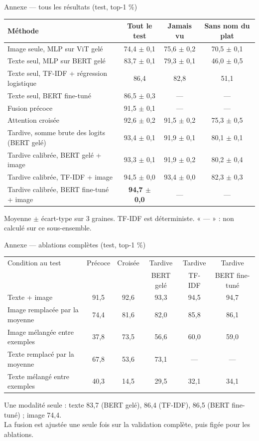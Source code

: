 \documentclass[aspectratio=169,11pt]{beamer}
\begin{document}
\begin{frame}{Annexe — tous les résultats (test, top-1 \%)}
\centering\small
\begin{tabular}{@{}lccc@{}}
\toprule
Méthode & Tout le test & Jamais vu & Sans nom du plat\\
\midrule
Image seule, MLP sur ViT gelé & 74,4 $\pm$ 0,1 & 75,6 $\pm$ 0,2 & 70,5 $\pm$ 0,1\\
Texte seul, MLP sur BERT gelé & 83,7 $\pm$ 0,1 & 79,3 $\pm$ 0,1 & 46,0 $\pm$ 0,5\\
Texte seul, TF-IDF + régression logistique & 86,4 & 82,8 & 51,1\\
Texte seul, BERT fine-tuné & 86,5 $\pm$ 0,3 & — & —\\
\midrule
Fusion précoce & 91,5 $\pm$ 0,1 & — & —\\
Attention croisée & 92,6 $\pm$ 0,2 & 91,5 $\pm$ 0,2 & 75,3 $\pm$ 0,5\\
Tardive, somme brute des logits (BERT gelé) & 93,4 $\pm$ 0,1 & 91,9 $\pm$ 0,1 & 80,1 $\pm$ 0,1\\
Tardive calibrée, BERT gelé + image & 93,3 $\pm$ 0,1 & 91,9 $\pm$ 0,2 & 80,2 $\pm$ 0,4\\
Tardive calibrée, TF-IDF + image & 94,5 $\pm$ 0,0 & 93,4 $\pm$ 0,0 & 82,3 $\pm$ 0,3\\
Tardive calibrée, BERT fine-tuné + image & \textbf{94,7 $\pm$ 0,0} & — & —\\
\bottomrule
\end{tabular}

\vspace{0.6em}
{\scriptsize\color{mute}Moyenne $\pm$ écart-type sur 3 graines. TF-IDF est déterministe.
« — » : non calculé sur ce sous-ensemble.}
\end{frame}

\begin{frame}{Annexe — ablations complètes (test, top-1 \%)}
\centering\small
\begin{tabular}{@{}lccccc@{}}
\toprule
Condition au test & Précoce & Croisée & Tardive & Tardive & Tardive\\
 & & & BERT gelé & TF-IDF & BERT fine-tuné\\
\midrule
Texte + image & 91,5 & 92,6 & 93,3 & 94,5 & 94,7\\
Image remplacée par la moyenne & 74,4 & 81,6 & 82,0 & 85,8 & 86,1\\
Image mélangée entre exemples & 37,8 & 73,5 & 56,6 & 60,0 & 59,0\\
Texte remplacé par la moyenne & 67,8 & 53,6 & 73,1 & — & —\\
Texte mélangé entre exemples & 40,3 & 14,5 & 29,5 & 32,1 & 34,1\\
\bottomrule
\end{tabular}

\vspace{0.8em}
{\footnotesize\color{mute}Une modalité seule : texte 83,7 (BERT gelé), 86,4 (TF-IDF), 86,5 (BERT fine-tuné) ; image 74,4.\\
La fusion est ajustée une seule fois sur la validation complète, puis figée pour les ablations.}
\end{frame}
\end{document}
